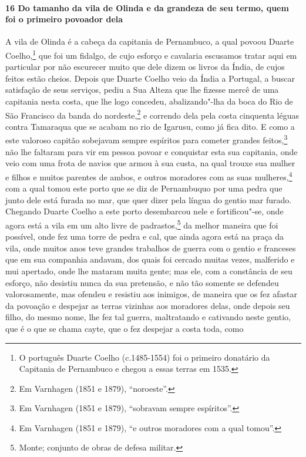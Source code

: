 \paragraph{16 Do tamanho da vila de Olinda e da grandeza de seu termo, quem foi o primeiro
povoador dela}

A vila de Olinda é a cabeça da capitania de Pernambuco, a qual povoou Duarte
Coelho,\footnote{ O português Duarte Coelho (c.1485-1554) foi o primeiro donatário da
Capitania de Pernambuco e chegou a essas terras em 1535.} que foi um fidalgo, de cujo
esforço e cavalaria escusamos tratar aqui em particular por não escurecer muito que dele
dizem os livros da Índia, de cujos feitos estão cheios. Depois que Duarte Coelho veio da
Índia a Portugal, a buscar satisfação de seus serviços, pediu a Sua Alteza que lhe fizesse
mercê de uma capitania nesta costa, que lhe logo concedeu, abalizando"-lha da boca do Rio
de São Francisco da banda do nordeste,\footnote{ Em Varnhagen (1851 e 1879),
``noroeste''.} e correndo dela pela costa cinquenta léguas contra Tamaraqua que se acabam
no rio de Igarusu, como já fica dito. E como a este valoroso capitão sobejavam sempre
espíritos para cometer grandes feitos,\footnote{ Em Varnhagen (1851 e 1879), ``sobravam
sempre espíritos''.} não lhe faltaram para vir em pessoa povoar e conquistar esta sua
capitania, onde veio com uma frota de navios que armou à sua custa, na qual trouxe sua
mulher e filhos e muitos parentes de ambos, e outros moradores com as suas
mulheres,\footnote{ Em Varnhagen (1851 e 1879), ``e outros moradores com a qual tomou''.}
com a qual tomou este porto que se diz de Pernambuquo por uma pedra que junto dele está
furada no mar, que quer dizer pela língua do gentio mar furado. Chegando Duarte Coelho a
este porto desembarcou nele e fortificou"-se, onde agora está a vila em um alto livre de
padrastos,\footnote{ Monte; conjunto de obras de defesa militar.} da melhor maneira que
foi possível, onde fez uma torre de pedra e cal, que ainda agora está na praça da vila,
onde muitos anos teve grandes trabalhos de guerra com o gentio e franceses que em sua
companhia andavam, dos quais foi cercado muitas vezes, malferido e mui apertado, onde lhe
mataram muita gente; mas ele, com a constância de seu esforço, não desistiu nunca da sua
pretensão, e não tão somente se defendeu valorosamente, mas ofendeu e resistiu aos
inimigos, de maneira que os fez afastar da povoação e despejar as terras vizinhas aos
moradores delas, onde depois seu filho, do mesmo nome, lhe fez tal guerra, maltratando e
cativando neste gentio, que é o que se chama cayte, que o fez despejar a costa toda, como
